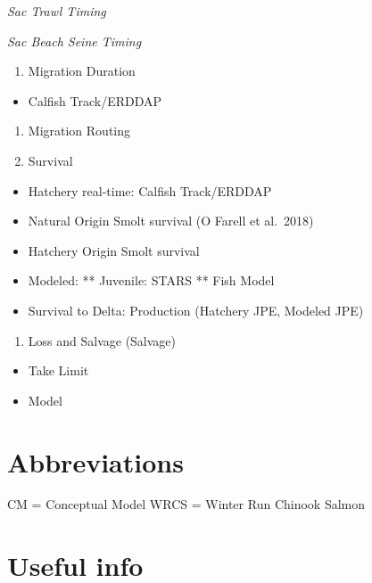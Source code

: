 \documentclass[
]{book}
\providecommand{\tightlist}{%
  \setlength{\itemsep}{0pt}\setlength{\parskip}{0pt}}
\theoremstyle{definition}
\theoremstyle{definition}
\theoremstyle{definition}
\theoremstyle{definition}
\theoremstyle{remark}
\begin{document}
\emph{Sac Trawl Timing}

\emph{Sac Beach Seine Timing}

\begin{enumerate}
\def\labelenumi{\arabic{enumi}.}
\setcounter{enumi}{3}
\tightlist
\item
  Migration Duration
\end{enumerate}

\begin{itemize}
\tightlist
\item
  Calfish Track/ERDDAP
\end{itemize}

\begin{enumerate}
\def\labelenumi{\arabic{enumi}.}
\setcounter{enumi}{4}
\item
  Migration Routing
\item
  Survival
\end{enumerate}

\begin{itemize}
\tightlist
\item
  Hatchery real-time: Calfish Track/ERDDAP
\item
  Natural Origin Smolt survival (O Farell et al.~2018)
\item
  Hatchery Origin Smolt survival
\item
  Modeled:
  ** Juvenile: STARS
  ** Fish Model
\item
  Survival to Delta: Production (Hatchery JPE, Modeled JPE)
\end{itemize}

\begin{enumerate}
\def\labelenumi{\arabic{enumi}.}
\setcounter{enumi}{6}
\tightlist
\item
  Loss and Salvage (Salvage)
\end{enumerate}

\begin{itemize}
\tightlist
\item
  Take Limit
\item
  Model
\end{itemize}

\hypertarget{abbreviations}{%
\chapter{Abbreviations}\label{abbreviations}}

CM = Conceptual Model
WRCS = Winter Run Chinook Salmon

\hypertarget{useful-info}{%
\chapter{Useful info}\label{useful-info}}
\end{document}
